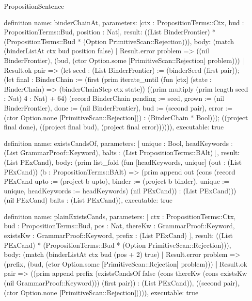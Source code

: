 \begin{lexlean}{PropositionSentence}
\begin{semanticmodule}
definition{
  name: binderChainAt,
  parameters: [ctx : PropositionTerms::Ctx, bud : PropositionTerms::Bud, position : Nat],
  result: ((List BinderFrontier) * (PropositionTerms::Bud * (Option PrimitiveScan::Rejection))),
  body: (match (binderListAt ctx bud position false)
    | Result.error problem => ((nil BinderFrontier), (bud, (ctor Option.some [PrimitiveScan::Rejection] problem)))
    | Result.ok pair => (let seed : (List BinderFrontier) := (binderSeed (first pair)); (let final : BinderChain := (first (prim iterate_until (fun [ctx] (state : BinderChain) => (binderChainStep ctx state)) ((prim multiply (prim length seed : Nat) 4 : Nat) + 64) (record BinderChain {pending := seed, grown := (nil BinderFrontier), done := (nil BinderFrontier), bud := (second pair), error := (ctor Option.none [PrimitiveScan::Rejection])}) : (BinderChain * Bool))); ((project final done), ((project final bud), (project final error)))))),
  executable: true
}

definition{
  name: existsCandsOf,
  parameters: [
    unique : Bool,
    headKeywords : (List GrammarProof::Keyword),
    balts : (List PropositionTerms::BAlt)
  ],
  result: (List PExCand),
  body: (prim list_fold (fun [headKeywords, unique] (out : (List PExCand)) (b : PropositionTerms::BAlt) => (prim append out (cons (record PExCand {upto := (project b upto), binder := (project b binder), unique := unique, headKeywords := headKeywords}) (nil PExCand)) : (List PExCand))) (nil PExCand) balts : (List PExCand)),
  executable: true
}

definition{
  name: plainExistsCands,
  parameters: [
    ctx : PropositionTerms::Ctx,
    bud : PropositionTerms::Bud,
    pos : Nat,
    thereKw : GrammarProof::Keyword,
    existsKw : GrammarProof::Keyword,
    prefix : (List PExCand)
  ],
  result: ((List PExCand) * (PropositionTerms::Bud * (Option PrimitiveScan::Rejection))),
  body: (match (binderListAt ctx bud (pos + 2) true)
    | Result.error problem => (prefix, (bud, (ctor Option.some [PrimitiveScan::Rejection] problem)))
    | Result.ok pair => ((prim append prefix (existsCandsOf false (cons thereKw (cons existsKw (nil GrammarProof::Keyword))) (first pair)) : (List PExCand)), ((second pair), (ctor Option.none [PrimitiveScan::Rejection])))),
  executable: true
}


\end{semanticmodule}
\end{lexlean}
